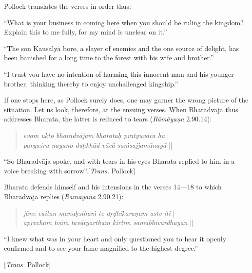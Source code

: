 Pollock translates the verses in order thus:

\begin{myquote}
“What is your business in coming here when you should be ruling the kingdom? Explain this to me fully, for my mind is unclear on it.” 

“The son Kausalyā bore, a slayer of enemies and the one source of delight, has been banished for a long time to the forest with his wife and brother.”			 

“I trust you have no intention of harming this innocent man and his younger brother, thinking thereby to enjoy unchallenged kingship.”
\end{myquote}

If one stops here, as Pollock surely does, one may garner the wrong picture of the situation. Let us look, therefore, at the ensuing verses. When Bharadvāja thus addresses Bharata, the latter is reduced to tears ({\sl Rāmāyaṇa} 2.90.14):
\begin{quote}
{{\sl evam ukto bharadvājam bharataḥ pratyuvāca ha}}\label{verse26} |\\
{\sl paryaśru-nayano duḥkhād vācā saṁsajjamānayā} || 
\end{quote}

\begin{myquote}
“So Bharadvāja spoke, and with tears in his eyes Bharata replied to him in a voice breaking with sorrow”.\hfill [{\sl Trans.} Pollock]  
\end{myquote}

Bharata defends himself and his intensions in the verses 14---18 to which Bharadvāja replies ({\sl Rāmāyaṇa} 2.90.21):

\newpage

\begin{quote}
{{\sl jāne caitan manaḥsthaṁ te dṛḍhīkaraṇam astv iti}}\label{verse27} |\\
{\sl apṛccham tvāṁ tavātyartham kīrtiṁ samabhivardhayan} || 
\end{quote}

\begin{myquote}
“I knew what was in your heart and only questioned you to hear it openly confirmed and to see your fame magnified to the highest degree.” 

\hfill[{\sl Trans.} Pollock]
\end{myquote}

